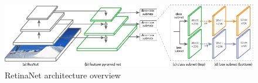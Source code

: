 \begin{figure}[h]
    \centering
    \includegraphics[page=1,width=\linewidth]{images/retinanet.pdf}
    \caption{RetinaNet architecture overview \cite{lin2018focalloss}}
    \label{fig:retinanet}
\end{figure}
